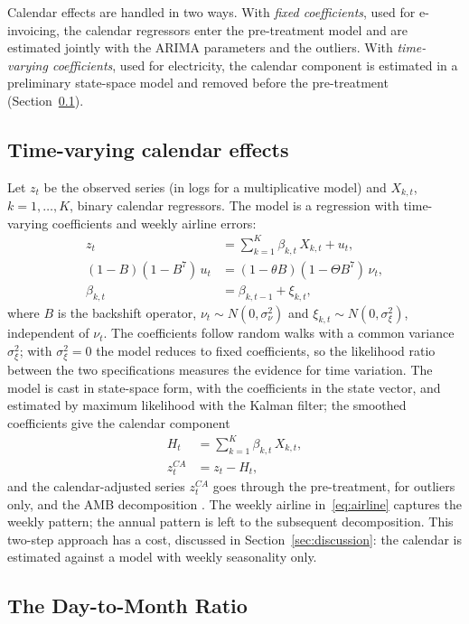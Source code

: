 \documentclass[Afour, times]{sagej}
\begin{document}
Calendar effects are handled in two ways. With \emph{fixed coefficients}, used for e-invoicing, the calendar regressors enter the pre-treatment model and are estimated jointly with the ARIMA parameters and the outliers. With \emph{time-varying coefficients}, used for electricity, the calendar component is estimated in a preliminary state-space model and removed before the pre-treatment (Section~\ref{subsec:tv}).

\subsection{Time-varying calendar effects}
\label{subsec:tv}

Let $z_t$ be the observed series (in logs for a multiplicative model) and $X_{k,t}$, $k=1,\dots,K$, binary calendar regressors. The model is a regression with time-varying coefficients and weekly airline errors:
\begin{align}
z_t &= \sum_{k=1}^{K} \beta_{k,t}\, X_{k,t} + u_t, \label{eq:obs}\\
(1-B)(1-B^7)\, u_t &= (1-\theta B)(1-\Theta B^7)\, \nu_t, \label{eq:airline}\\
\beta_{k,t} &= \beta_{k,t-1} + \xi_{k,t}, \label{eq:rw}
\end{align}
where $B$ is the backshift operator, $\nu_t \sim N(0,\sigma^2_\nu)$ and $\xi_{k,t} \sim N(0,\sigma^2_\xi)$, independent of $\nu_t$. The coefficients follow random walks with a common variance $\sigma^2_\xi$; with $\sigma^2_\xi = 0$ the model reduces to fixed coefficients, so the likelihood ratio between the two specifications measures the evidence for time variation. The model is cast in state-space form, with the coefficients in the state vector, and estimated by maximum likelihood with the Kalman filter; the smoothed coefficients give the calendar component
\begin{align}
H_t &= \sum_{k=1}^{K} \beta_{k,t}\, X_{k,t}, \label{eq:H}\\
z^{CA}_t &= z_t - H_t, \nonumber
\end{align}
and the calendar-adjusted series $z^{CA}_t$ goes through the pre-treatment, for outliers only, and the AMB decomposition \cite{durbinkoopman2012}. The weekly airline in~\eqref{eq:airline} captures the weekly pattern; the annual pattern is left to the subsequent decomposition. This two-step approach has a cost, discussed in Section~\ref{sec:discussion}: the calendar is estimated against a model with weekly seasonality only.

\subsection{The Day-to-Month Ratio}
\label{subsec:dmr}
\end{document}

